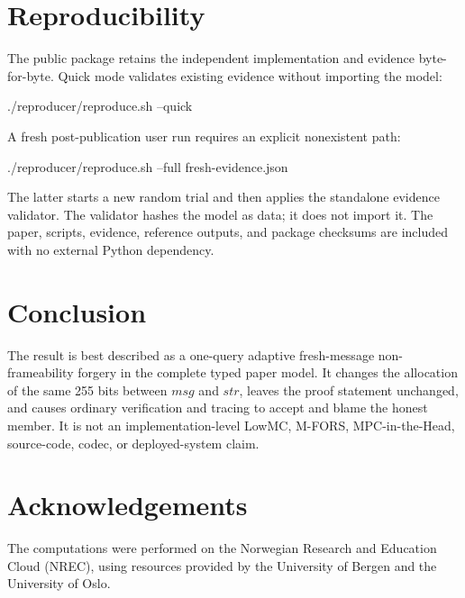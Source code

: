 \documentclass[10pt,a4paper]{article}
\newcommand{\strr}{\mathit{str}}
\newcommand{\msg}{\mathit{msg}}
\begin{document}
\section{Reproducibility}

The public package retains the independent implementation and evidence
byte-for-byte. Quick mode validates existing evidence without importing the
model:
\begin{center}
\ttfamily ./reproducer/reproduce.sh --quick
\end{center}
A fresh post-publication user run requires an explicit nonexistent path:
\begin{center}
\ttfamily ./reproducer/reproduce.sh --full fresh-evidence.json
\end{center}
The latter starts a new random trial and then applies the standalone evidence
validator. The validator hashes the model as data; it does not import it. The
paper, scripts, evidence, reference outputs, and package checksums are included
with no external Python dependency.

\section{Conclusion}

The result is best described as a one-query adaptive fresh-message
non-frameability forgery in the complete typed paper model. It changes the
allocation of the same 255 bits between $\msg$ and $\strr$, leaves the proof
statement unchanged, and causes ordinary verification and tracing to accept
and blame the honest member. It is not an implementation-level LowMC,
M-FORS, MPC-in-the-Head, source-code, codec, or deployed-system claim.

\section*{Acknowledgements}
The computations were performed on the Norwegian Research and Education Cloud (NREC), using resources provided by the University of Bergen and the University of Oslo.
\end{document}
